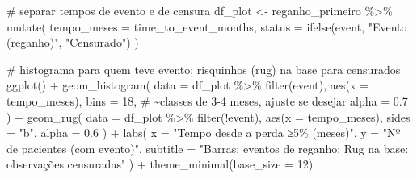 \documentclass[
]{article}
\newenvironment{Shaded}{\begin{snugshade}}{\end{snugshade}}
\newcommand{\AttributeTok}[1]{\textcolor[rgb]{0.40,0.45,0.13}{#1}}
\newcommand{\CommentTok}[1]{\textcolor[rgb]{0.37,0.37,0.37}{#1}}
\newcommand{\DecValTok}[1]{\textcolor[rgb]{0.68,0.00,0.00}{#1}}
\newcommand{\FloatTok}[1]{\textcolor[rgb]{0.68,0.00,0.00}{#1}}
\newcommand{\FunctionTok}[1]{\textcolor[rgb]{0.28,0.35,0.67}{#1}}
\newcommand{\NormalTok}[1]{\textcolor[rgb]{0.00,0.23,0.31}{#1}}
\newcommand{\OtherTok}[1]{\textcolor[rgb]{0.00,0.23,0.31}{#1}}
\newcommand{\SpecialCharTok}[1]{\textcolor[rgb]{0.37,0.37,0.37}{#1}}
\newcommand{\StringTok}[1]{\textcolor[rgb]{0.13,0.47,0.30}{#1}}
\begin{document}
\begin{Shaded}
\begin{Highlighting}[]
\CommentTok{\# separar tempos de evento e de censura}
\NormalTok{df\_plot }\OtherTok{\textless{}{-}}\NormalTok{ reganho\_primeiro }\SpecialCharTok{\%\textgreater{}\%}
  \FunctionTok{mutate}\NormalTok{(}
    \AttributeTok{tempo\_meses =}\NormalTok{ time\_to\_event\_months,}
    \AttributeTok{status =} \FunctionTok{ifelse}\NormalTok{(event, }\StringTok{"Evento (reganho)"}\NormalTok{, }\StringTok{"Censurado"}\NormalTok{)}
\NormalTok{  )}

\CommentTok{\# histograma para quem teve evento; risquinhos (rug) na base para censurados}
\FunctionTok{ggplot}\NormalTok{() }\SpecialCharTok{+}
  \FunctionTok{geom\_histogram}\NormalTok{(}
    \AttributeTok{data =}\NormalTok{ df\_plot }\SpecialCharTok{\%\textgreater{}\%} \FunctionTok{filter}\NormalTok{(event),}
    \FunctionTok{aes}\NormalTok{(}\AttributeTok{x =}\NormalTok{ tempo\_meses),}
    \AttributeTok{bins =} \DecValTok{18}\NormalTok{,  }\CommentTok{\# \textasciitilde{}classes de 3{-}4 meses, ajuste se desejar}
    \AttributeTok{alpha =} \FloatTok{0.7}
\NormalTok{  ) }\SpecialCharTok{+}
  \FunctionTok{geom\_rug}\NormalTok{(}
    \AttributeTok{data =}\NormalTok{ df\_plot }\SpecialCharTok{\%\textgreater{}\%} \FunctionTok{filter}\NormalTok{(}\SpecialCharTok{!}\NormalTok{event),}
    \FunctionTok{aes}\NormalTok{(}\AttributeTok{x =}\NormalTok{ tempo\_meses),}
    \AttributeTok{sides =} \StringTok{"b"}\NormalTok{,}
    \AttributeTok{alpha =} \FloatTok{0.6}
\NormalTok{  ) }\SpecialCharTok{+}
  \FunctionTok{labs}\NormalTok{(}
    \AttributeTok{x =} \StringTok{"Tempo desde a perda ≥5\% (meses)"}\NormalTok{,}
    \AttributeTok{y =} \StringTok{"Nº de pacientes (com evento)"}\NormalTok{,}
    \AttributeTok{subtitle =} \StringTok{"Barras: eventos de reganho; Rug na base: observações censuradas"}
\NormalTok{  ) }\SpecialCharTok{+}
  \FunctionTok{theme\_minimal}\NormalTok{(}\AttributeTok{base\_size =} \DecValTok{12}\NormalTok{)}
\end{Highlighting}
\end{Shaded}
\end{document}
